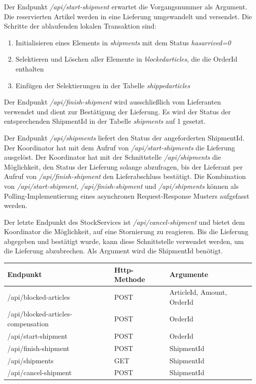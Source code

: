 Der Endpunkt \textit{/api/start-shipment} erwartet die Vorgangsnummer als Argument. Die reservierten Artikel werden in eine Lieferung umgewandelt und versendet. Die Schritte der ablaufenden lokalen Transaktion sind:
\begin{enumerate}
	\item Initialisieren eines Elements in \textit{shipments} mit dem Status \textit{hasarrived=0}
	\item Selektieren und Löschen aller Elemente in \textit{blockedarticles}, die die OrderId enthalten
	\item Einfügen der Selektierungen in der Tabelle \textit{shippedarticles}
\end{enumerate}

Der Endpunkt \textit{/api/finish-shipment} wird ausschließlich vom Lieferanten verwendet und dient zur Bestätigung der Lieferung. Es wird der Status der entsprechenden ShipmentId in der Tabelle \textit{shipments} auf 1 gesetzt.

Der Endpunkt \textit{/api/shipments} liefert den Status der angeforderten ShipmentId. Der Koordinator hat mit dem Aufruf von \textit{/api/start-shipments} die Lieferung ausgelöst. Der Koordinator hat mit der Schnittstelle \textit{/api/shipments} die Möglichkeit, den Status der Lieferung solange abzufragen, bis der Lieferant per Aufruf von \textit{/api/finish-shipment} den Lieferabschluss bestätigt. Die Kombination von \textit{/api/start-shipment}, \textit{/api/finish-shipment} und \textit{/api/shipments} können als Polling-Implementierung eines asynchronen Request-Response Musters aufgefasst werden. 

Der letzte Endpunkt des StockServices ist \textit{/api/cancel-shipment} und bietet dem Koordinator die Möglichkeit, auf eine Stornierung zu reagieren. Bis die Lieferung abgegeben und bestätigt wurde, kann diese Schnittstelle verwendet werden, um die Lieferung abzubrechen. Als Argument wird die ShipmentId benötigt.

\begin{center}
	\begin{tabular}[h]{|p{6.5cm}|p{3cm}|p{5.1cm}|}
		\hline
		Endpunkt & Http-Methode & Argumente \\ \hline
		/api/blocked-articles & POST & ArticleId, Amount, OrderId\\ \hline
		/api/blocked-articles-compensation & POST & OrderId \\ \hline
		/api/start-shipment & POST & OrderId \\ \hline
		/api/finish-shipment & POST & ShipmentId \\ \hline
		/api/shipments & GET & ShipmentId \\ \hline
		/api/cancel-shipment & POST & ShipmentId \\ \hline
	\end{tabular}
\end{center}
\FloatBarrier

